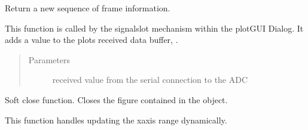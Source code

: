 \documentclass[letterpaper,10pt,english]{sphinxmanual}
\begin{document}
\begin{fulllineitems}

\begin{fulllineitems}
\label{\detokenize{animation:animation.CustomFigCanvas.new_frame_seq}}
Return a new sequence of frame information.

\end{fulllineitems}


\begin{fulllineitems}
\label{\detokenize{animation:animation.CustomFigCanvas.addData}}
This function is called by the signal\sphinxhyphen{}slot mechanism within the plotGUI Dialog.
It adds a value to the plots received data buffer, .
\begin{quote}\begin{description}
\item[{Parameters}] \leavevmode
{} \textendash{} received value from the serial connection to the ADC

\end{description}\end{quote}

\end{fulllineitems}


\begin{fulllineitems}
\label{\detokenize{animation:animation.CustomFigCanvas.close}}
Soft close function. Closes the figure contained in the object.

\end{fulllineitems}


\begin{fulllineitems}
\label{\detokenize{animation:animation.CustomFigCanvas.update_xlim}}
This function handles updating the x\sphinxhyphen{}axis range dynamically.


\end{fulllineitems}
\end{fulllineitems}
\end{document}
